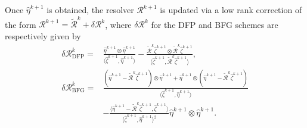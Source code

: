 \documentclass[onefignum,onetabnum]{siamart190516}
\numberwithin{equation}{section}
\begin{document}
Once $\hat{\eta}^{k+1}$ is obtained, the resolver $\mathcal{R}^{k+1}$ is updated via a low rank correction of the form $\mathcal{R}^{k+1} = \widetilde{\mathcal{R}}^{k} + \delta \mathcal{R}^{k}$, where $\delta \mathcal{R}^{k}$ for the DFP and BFG schemes are respectively given by
\begin{align}
\delta\mathcal{R}^{k}_{\mathrm{DFP}} =& \frac{\hat{\eta}^{k+1} \otimes \hat{\eta}^{k+1}}{\langle \hat{\zeta}^{k+1}, \hat{\eta}^{k+1} \rangle} - \frac{\widetilde{\mathcal{R}}^{k} \hat{\zeta}^{k+1} \otimes \widetilde{\mathcal{R}}^{k} \hat{\zeta}^{k+1}}{\langle \hat{\zeta}^{k+1}, \widetilde{\mathcal{R}}^{k} \hat{\zeta}^{k+1} \rangle}, \label{eqn:DFP} \\
\delta\mathcal{R}^{k}_{\mathrm{BFG}} =& \frac{(\hat{\eta}^{k+1} - \widetilde{\mathcal{R}}^{k} \hat{\zeta}^{k+1}) \otimes \hat{\eta}^{k+1} + \hat{\eta}^{k+1} \otimes (\hat{\eta}^{k+1} - \widetilde{\mathcal{R}}^{k} \hat{\zeta}^{k+1})}{\langle \hat{\zeta}^{k+1}, \hat{\eta}^{k+1} \rangle} \nonumber \\
{}& - \frac{\langle \hat{\eta}^{k+1} - \widetilde{\mathcal{R}}^{k} \hat{\zeta}^{k+1}, \hat{\zeta}^{k+1} \rangle}{\langle \hat{\zeta}^{k+1}, \hat{\eta}^{k+1} \rangle^{2}} \hat{\eta}^{k+1} \otimes \hat{\eta}^{k+1}.\label{eqn:BFG}
\end{align}
\end{document}
